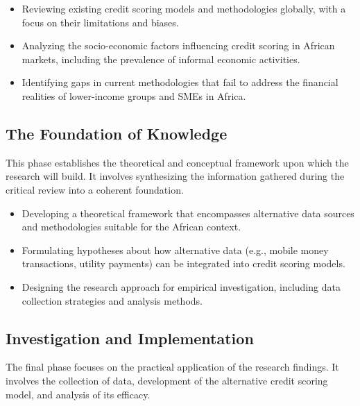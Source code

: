 \documentclass[a4paper,11pt,fleqn]{report}
\begin{document}
\begin{itemize}
    \item Reviewing existing credit scoring models and methodologies globally, with a focus on their limitations and biases.
    \item Analyzing the socio-economic factors influencing credit scoring in African markets, including the prevalence of informal economic activities.
    \item Identifying gaps in current methodologies that fail to address the financial realities of lower-income groups and SMEs in Africa.
\end{itemize}

\subsection{The Foundation of Knowledge}
This phase establishes the theoretical and conceptual framework upon which the research will build. It involves synthesizing the information gathered during the critical review into a coherent foundation.

\begin{itemize}
    \item Developing a theoretical framework that encompasses alternative data sources and methodologies suitable for the African context.
    \item Formulating hypotheses about how alternative data (e.g., mobile money transactions, utility payments) can be integrated into credit scoring models.
    \item Designing the research approach for empirical investigation, including data collection strategies and analysis methods.
\end{itemize}

\subsection{Investigation and Implementation}
The final phase focuses on the practical application of the research findings. It involves the collection of data, development of the alternative credit scoring model, and analysis of its efficacy.
\end{document}
